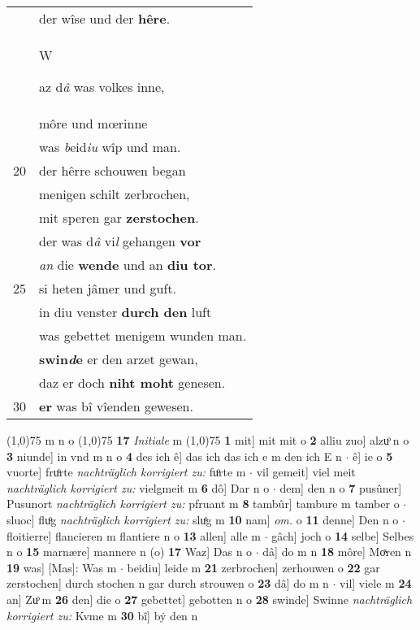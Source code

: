 \documentclass[8pt,a4paper,notitlepage]{article}
\begin{document}
\begin{table}[ht]
\begin{minipage}[t]{0.5\linewidth}
\begin{tabular}{rl}
 & der wîse und der \textbf{hêre}.\\ 
 & \begin{large}W\end{large}az d\textit{â} was volkes inne,\\ 
 & môre und mœrinne\\ 
 & was \textit{b}eid\textit{iu} wîp und man.\\ 
20 & der hêrre schouwen began\\ 
 & menigen schilt zerbrochen,\\ 
 & mit speren gar \textbf{zerstochen}.\\ 
 & der was d\textit{â} vi\textit{l} gehangen \textbf{vor}\\ 
 & \textit{an} die \textbf{wende} und an \textbf{diu tor}.\\ 
25 & si heten jâmer und guft.\\ 
 & in diu venster \textbf{durch den} luft\\ 
 & was gebettet menigem wunden man.\\ 
 & \textbf{swin\textit{d}e} er den arzet gewan,\\ 
 & daz er doch \textbf{niht moht} genesen.\\ 
30 & \textbf{er} was bî vîenden gewesen.\\ 
\end{tabular}
\scriptsize
\line(1,0){75} \newline
m n o \newline
\line(1,0){75} \newline
\textbf{17} \textit{Initiale} m  \newline
\line(1,0){75} \newline
\textbf{1} mit] mit mit o \textbf{2} alliu zuo] alzuͦ n o \textbf{3} niunde] in vnd m n o \textbf{4} des ich ê] das ich das ich e m den ich E n  $\cdot$ ê] ie o \textbf{5} vuorte] fruͦrte \textit{nachträglich korrigiert zu:} fuͦrte m  $\cdot$ vil gemeit] viel meit \textit{nachträglich korrigiert zu:} vielgmeit m \textbf{6} dô] Dar n o  $\cdot$ dem] den n o \textbf{7} pusûner] Pusunort \textit{nachträglich korrigiert zu:} pfruant m \textbf{8} tambûr] tambure m tamber o  $\cdot$ sluoc] fluͦg \textit{nachträglich korrigiert zu:} sluͦg m \textbf{10} nam] \textit{om.} o \textbf{11} denne] Den n o  $\cdot$ floitierre] flancieren m flantiere n o \textbf{13} allen] alle m  $\cdot$ gâch] joch o \textbf{14} selbe] Selbes n o \textbf{15} marnære] mannere n (o) \textbf{17} Waz] Das n o  $\cdot$ dâ] do m n \textbf{18} môre] Moͯren n \textbf{19} was] [Mas]: Was m  $\cdot$ beidiu] leide m \textbf{21} zerbrochen] zerhouwen o \textbf{22} gar zerstochen] durch stochen n gar durch strouwen o \textbf{23} dâ] do m n  $\cdot$ vil] viele m \textbf{24} an] Zuͦ m \textbf{26} den] die o \textbf{27} gebettet] gebotten n o \textbf{28} swinde] Swinne \textit{nachträglich korrigiert zu:} Kvme m \textbf{30} bî] bẏ den n \newline
\end{minipage}
\end{table}
\end{document}
